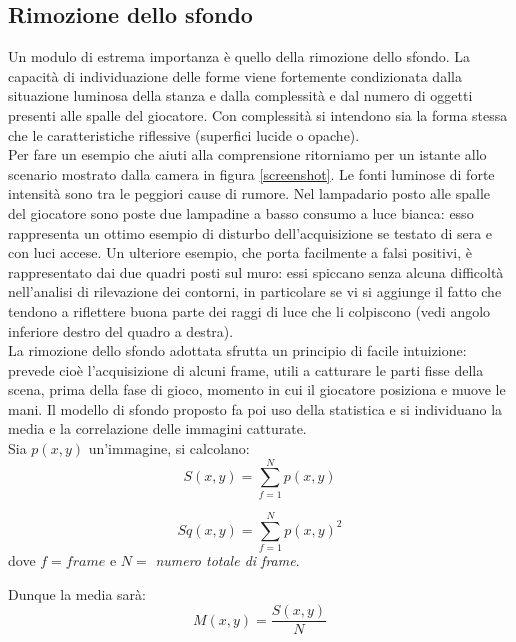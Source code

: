 \documentclass[a4paper,10pt, twocolumn]{article}
\begin{document}
  \subsection{Rimozione dello sfondo}\label{bgremoval}
  Un modulo di estrema importanza \`{e} quello della rimozione dello sfondo.
  La capacit\`{a} di individuazione delle forme viene fortemente condizionata
  dalla situazione luminosa della stanza e dalla complessit\`{a} 
  e dal numero di oggetti presenti alle spalle del giocatore.
  Con complessit\`{a} si intendono sia la forma stessa che le caratteristiche 
  riflessive (superfici lucide o opache).\\
  Per fare un esempio che aiuti alla comprensione ritorniamo per un istante
  allo scenario mostrato dalla camera in figura \ref{screenshot}.
  Le fonti luminose di forte intensit\`{a} sono tra le peggiori 
  cause di rumore. Nel lampadario posto alle spalle del giocatore sono poste
  due lampadine a basso consumo a luce bianca: esso rappresenta un ottimo esempio
  di disturbo dell'acquisizione se testato di sera e con luci accese.
  Un ulteriore esempio, che porta facilmente a falsi positivi,
  \`{e} rappresentato dai due quadri posti sul muro: essi spiccano senza alcuna
  difficolt\`{a} nell'analisi di rilevazione dei contorni, in particolare 
  se vi si aggiunge il fatto che tendono a riflettere buona parte dei
  raggi di luce che li colpiscono (vedi angolo inferiore destro del quadro 
  a destra).\\
  La rimozione dello sfondo adottata sfrutta un principio di facile intuizione: 
  prevede cio\`{e} l'acquisizione di alcuni frame,
  utili a catturare le parti fisse della scena,
  prima della fase di gioco, momento in cui il giocatore
  posiziona e muove le mani. Il modello di sfondo proposto fa poi uso 
  della statistica e si individuano la media e la correlazione 
  delle immagini catturate.\\
  Sia $p(x,y)$ un'immagine, si calcolano: 
  \begin{equation}
  S(x,y) = \sum_{f=1}^{N} p(x,y) 
  \end{equation} 
  
  \begin{equation}
  Sq(x,y) = \sum_{f=1}^{N} p(x,y)^2 
  \end{equation}   
  dove $f=frame$ e $N=$ \textit{numero totale di frame}.
  
  Dunque la media sar\`{a}:  
  \begin{equation}
   M(x,y) = \dfrac{S(x,y)}{N}
  \end{equation}
  
\end{document}
